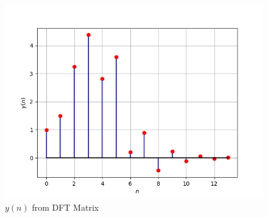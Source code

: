 \documentclass[journal,12pt,twocolumn]{IEEEtran}
\theoremstyle{remark}
\numberwithin{equation}{subsection}
\begin{document}
\begin{figure}[!ht]
\centering
\includegraphics[width=\columnwidth]{figs/matrix.png}
\caption{$y(n)$ from DFT Matrix}
\label{fig:yn_DFT_matrix}
\end{figure}
\end{document}
